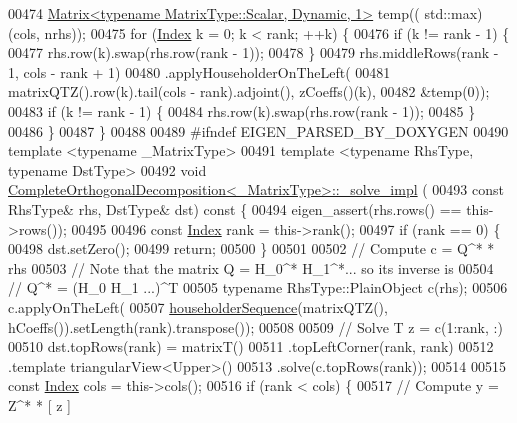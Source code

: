 \begin{DoxyCode}
00474   \hyperlink{group___core___module_class_eigen_1_1_matrix}{Matrix<typename MatrixType::Scalar, Dynamic, 1>} temp((
      std::max)(cols, nrhs));
00475   \textcolor{keywordflow}{for} (\hyperlink{namespace_eigen_a62e77e0933482dafde8fe197d9a2cfde}{Index} k = 0; k < rank; ++k) \{
00476     \textcolor{keywordflow}{if} (k != rank - 1) \{
00477       rhs.row(k).swap(rhs.row(rank - 1));
00478     \}
00479     rhs.middleRows(rank - 1, cols - rank + 1)
00480         .applyHouseholderOnTheLeft(
00481             matrixQTZ().row(k).tail(cols - rank).adjoint(), zCoeffs()(k),
00482             &temp(0));
00483     \textcolor{keywordflow}{if} (k != rank - 1) \{
00484       rhs.row(k).swap(rhs.row(rank - 1));
00485     \}
00486   \}
00487 \}
00488 
00489 \textcolor{preprocessor}{#ifndef EIGEN\_PARSED\_BY\_DOXYGEN}
00490 \textcolor{keyword}{template} <\textcolor{keyword}{typename} \_MatrixType>
00491 \textcolor{keyword}{template} <\textcolor{keyword}{typename} RhsType, \textcolor{keyword}{typename} DstType>
00492 \textcolor{keywordtype}{void} \hyperlink{group___q_r___module_class_eigen_1_1_complete_orthogonal_decomposition}{CompleteOrthogonalDecomposition<\_MatrixType>::\_solve\_impl}
      (
00493     \textcolor{keyword}{const} RhsType& rhs, DstType& dst)\textcolor{keyword}{ const }\{
00494   eigen\_assert(rhs.rows() == this->rows());
00495 
00496   \textcolor{keyword}{const} \hyperlink{namespace_eigen_a62e77e0933482dafde8fe197d9a2cfde}{Index} rank = this->rank();
00497   \textcolor{keywordflow}{if} (rank == 0) \{
00498     dst.setZero();
00499     \textcolor{keywordflow}{return};
00500   \}
00501 
00502   \textcolor{comment}{// Compute c = Q^* * rhs}
00503   \textcolor{comment}{// Note that the matrix Q = H\_0^* H\_1^*... so its inverse is}
00504   \textcolor{comment}{// Q^* = (H\_0 H\_1 ...)^T}
00505   \textcolor{keyword}{typename} RhsType::PlainObject c(rhs);
00506   c.applyOnTheLeft(
00507       \hyperlink{group___householder___module_ga4bd4b85120e014cf1125a054b02d4d92}{householderSequence}(matrixQTZ(), hCoeffs()).setLength(rank).transpose());
00508 
00509   \textcolor{comment}{// Solve T z = c(1:rank, :)}
00510   dst.topRows(rank) = matrixT()
00511                           .topLeftCorner(rank, rank)
00512                           .template triangularView<Upper>()
00513                           .solve(c.topRows(rank));
00514 
00515   \textcolor{keyword}{const} \hyperlink{namespace_eigen_a62e77e0933482dafde8fe197d9a2cfde}{Index} cols = this->cols();
00516   \textcolor{keywordflow}{if} (rank < cols) \{
00517     \textcolor{comment}{// Compute y = Z^* * [ z ]}

\end{DoxyCode}
